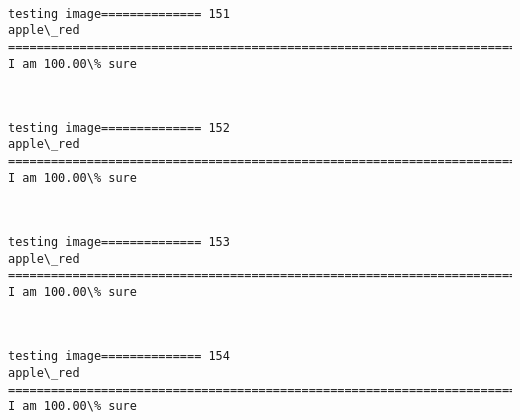 \documentclass[11pt]{article}
\begin{document}
    \begin{center}
    \end{center}
    { \hspace*{\fill} \\}
    
    \begin{Verbatim}[commandchars=\\\{\}]
testing image============== 151
apple\_red
============================================================================
I am 100.00\% sure

    \end{Verbatim}

    \begin{center}
    \end{center}
    { \hspace*{\fill} \\}
    
    \begin{Verbatim}[commandchars=\\\{\}]
testing image============== 152
apple\_red
============================================================================
I am 100.00\% sure

    \end{Verbatim}

    \begin{center}
    \end{center}
    { \hspace*{\fill} \\}
    
    \begin{Verbatim}[commandchars=\\\{\}]
testing image============== 153
apple\_red
============================================================================
I am 100.00\% sure

    \end{Verbatim}

    \begin{center}
    \end{center}
    { \hspace*{\fill} \\}
    
    \begin{Verbatim}[commandchars=\\\{\}]
testing image============== 154
apple\_red
============================================================================
I am 100.00\% sure

    \end{Verbatim}
\end{document}
